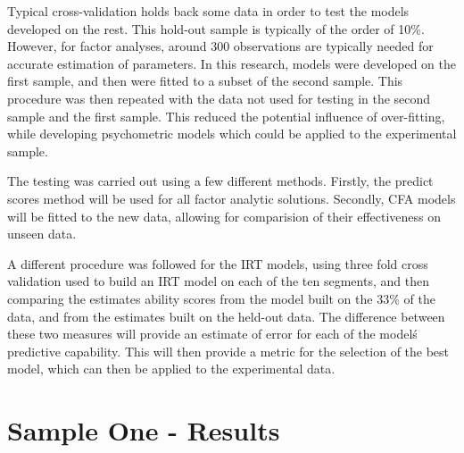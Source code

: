 \documentclass{article}
\begin{document}
Typical cross-validation holds back some data in order to test the models developed on the rest.  This hold-out sample is typically of the order of 10\%.  However, for factor analyses, around 300 observations are typically needed for accurate estimation of parameters.  
In this research, models were developed on the first sample, and then were fitted to a subset of the second sample.  This procedure was then  repeated with the data not used for testing in the second sample and the first sample.  This reduced the potential influence of over-fitting, while developing psychometric models which could be applied to the experimental sample. 


The testing was carried out using a few different methods.  Firstly, the predict scores method will be used for all factor analytic solutions.  Secondly,  CFA models will be fitted to the new data, allowing for comparision of their effectiveness on unseen data.  

A different procedure was  followed for the IRT models, using  three fold cross validation used to build an IRT model on each of the ten segments, and then comparing the estimates ability scores from the model built on the 33\% of the data, and from the estimates built on the held-out data. The difference between these two measures will provide an estimate of error for each of the model\'s predictive capability. This will then provide a metric for the selection of the best model, which can then be applied to the experimental data. 


\part{Sample One - Results}












\end{document}
